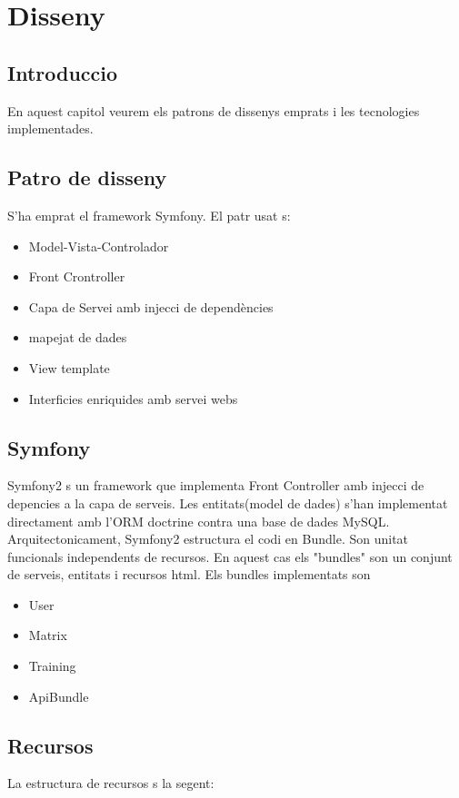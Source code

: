 \chapter{Disseny}
\label{cha:dessign}

\section{Introduccio}
En aquest capitol veurem els patrons de dissenys emprats i les tecnologies implementades.

\section{Patro de disseny}
S'ha emprat el framework Symfony. El patr usat s:
  \begin{itemize}
  \item Model-Vista-Controlador 
  \item Front Crontroller
  \item Capa de Servei amb injecci de depend\`{e}ncies
  \item mapejat de dades
  \item View template
  \item Interficies enriquides amb servei webs
  \end{itemize}

\section{Symfony}
Symfony2 s un framework que implementa Front Controller amb injecci de depencies a la capa de serveis. Les entitats(model de dades) s'han implementat directament amb l'ORM doctrine contra una base de dades MySQL.
Arquitectonicament, Symfony2 estructura el codi en Bundle. Son unitat funcionals independents de recursos. En aquest cas els "bundles" son un conjunt de serveis, entitats i recursos html. Els bundles implementats son
\begin{itemize}
\item{User}
\item{Matrix}
\item{Training}
\item{ApiBundle}
\end{itemize}

\section{Recursos}
La estructura de recursos s la segent:

